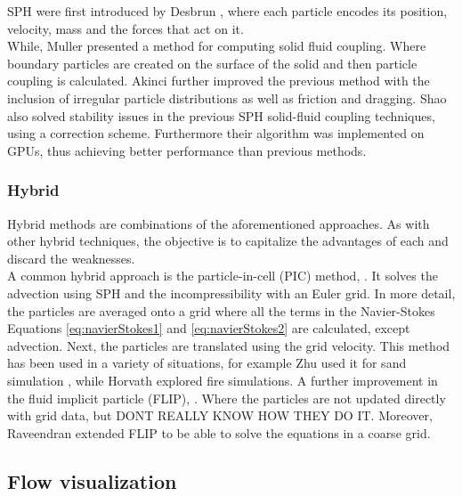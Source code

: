 SPH were first introduced by Desbrun \cite{DesbrunMathieuandGascuel1996}, where each particle encodes its position, velocity, mass and the forces that act on it.\\

While, Muller \cite{Muller2004} presented a method for computing solid fluid coupling. Where boundary particles are created on the surface of the solid and then particle coupling is calculated.
Akinci \cite{Akinci2012} further improved the previous method with the inclusion of irregular particle distributions as well as friction and dragging. 
Shao \cite{Shao2014} also solved stability issues in the previous SPH solid-fluid coupling techniques, using a correction scheme.
Furthermore their algorithm was implemented on GPUs, thus achieving better performance than previous methods.  

\subsubsection{Hybrid}

Hybrid methods are combinations of the aforementioned approaches.
As with other hybrid techniques, the objective is to capitalize the advantages of each and discard the weaknesses.\\

A common hybrid approach is the particle-in-cell (PIC) method, \cite{Harlow1962}.
It solves the advection using SPH and the incompressibility with an Euler grid.
In more detail, the particles are averaged onto a grid where all the terms in the Navier-Stokes Equations \ref{eq:navierStokes1} and \ref{eq:navierStokes2} are calculated, except advection.
Next, the particles are translated using the grid velocity.
This method has been used in a variety of situations, for example Zhu \cite{Zhu2005} used it for sand simulation , while Horvath \cite{Horvath2009} explored fire simulations.
A further improvement in the fluid implicit particle (FLIP), \cite{J.U.Brackbill1986}.
Where the particles are not updated directly with grid data, but 
DONT REALLY KNOW HOW THEY DO IT.
Moreover, Raveendran \cite{Raveendran2011} extended FLIP to be able to solve the equations in a coarse grid. 

\subsection{Flow visualization}

